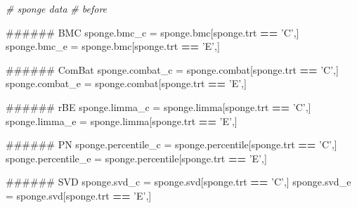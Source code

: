 \documentclass[]{book}
\newenvironment{Shaded}{\begin{snugshade}}{\end{snugshade}}
\newcommand{\StringTok}[1]{\textcolor[rgb]{0.31,0.60,0.02}{#1}}
\newcommand{\CommentTok}[1]{\textcolor[rgb]{0.56,0.35,0.01}{\textit{#1}}}
\newcommand{\OperatorTok}[1]{\textcolor[rgb]{0.81,0.36,0.00}{\textbf{#1}}}
\newcommand{\NormalTok}[1]{#1}
\begin{document}
\begin{Shaded}
\begin{Highlighting}[]
\CommentTok{# sponge data}
\CommentTok{# before}

\NormalTok{###### BMC}
\NormalTok{sponge.bmc_c =}\StringTok{ }\NormalTok{sponge.bmc[sponge.trt }\OperatorTok{==}\StringTok{ 'C'}\NormalTok{,]}
\NormalTok{sponge.bmc_e =}\StringTok{ }\NormalTok{sponge.bmc[sponge.trt }\OperatorTok{==}\StringTok{ 'E'}\NormalTok{,] }

\NormalTok{###### ComBat}
\NormalTok{sponge.combat_c =}\StringTok{ }\NormalTok{sponge.combat[sponge.trt }\OperatorTok{==}\StringTok{ 'C'}\NormalTok{,]}
\NormalTok{sponge.combat_e =}\StringTok{ }\NormalTok{sponge.combat[sponge.trt }\OperatorTok{==}\StringTok{ 'E'}\NormalTok{,] }

\NormalTok{###### rBE}
\NormalTok{sponge.limma_c =}\StringTok{ }\NormalTok{sponge.limma[sponge.trt }\OperatorTok{==}\StringTok{ 'C'}\NormalTok{,]}
\NormalTok{sponge.limma_e =}\StringTok{ }\NormalTok{sponge.limma[sponge.trt }\OperatorTok{==}\StringTok{ 'E'}\NormalTok{,] }

\NormalTok{###### PN}
\NormalTok{sponge.percentile_c =}\StringTok{ }\NormalTok{sponge.percentile[sponge.trt }\OperatorTok{==}\StringTok{ 'C'}\NormalTok{,]}
\NormalTok{sponge.percentile_e =}\StringTok{ }\NormalTok{sponge.percentile[sponge.trt }\OperatorTok{==}\StringTok{ 'E'}\NormalTok{,] }

\NormalTok{###### SVD}
\NormalTok{sponge.svd_c =}\StringTok{ }\NormalTok{sponge.svd[sponge.trt }\OperatorTok{==}\StringTok{ 'C'}\NormalTok{,]}
\NormalTok{sponge.svd_e =}\StringTok{ }\NormalTok{sponge.svd[sponge.trt }\OperatorTok{==}\StringTok{ 'E'}\NormalTok{,] }
\end{Highlighting}
\end{Shaded}
\end{document}

